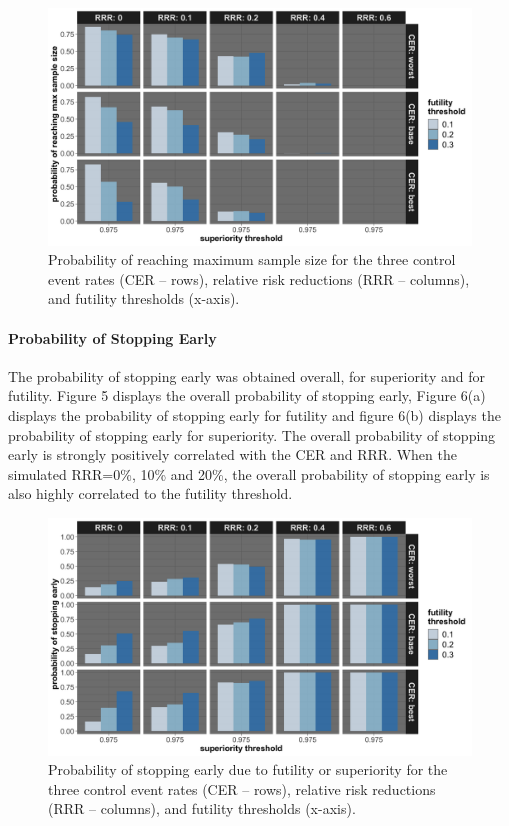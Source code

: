 \documentclass[]{article}
\let\oldparagraph\paragraph
\renewcommand{\paragraph}[1]{\oldparagraph{#1}\mbox{}}
\begin{document}
\begin{figure}
  \caption{Probability of reaching maximum sample size for the three control event rates (CER – rows), relative
  risk reductions (RRR – columns), and futility thresholds (x-axis).}
  \includegraphics{../p1_plots/batch_size_nb_1000/prob_reach_max_size_p1.png}
\end{figure}

\clearpage

\hypertarget{probability-of-stopping-early}{%
\paragraph{Probability of Stopping
Early}\label{probability-of-stopping-early}}

The probability of stopping early was obtained overall, for superiority
and for futility. Figure 5 displays the overall probability of stopping
early, Figure 6(a) displays the probability of stopping early for
futility and figure 6(b) displays the probability of stopping early for
superiority. The overall probability of stopping early is strongly
positively correlated with the CER and RRR. When the simulated RRR=0\%,
10\% and 20\%, the overall probability of stopping early is also highly
correlated to the futility threshold.

\begin{figure}
  \caption{Probability of stopping early due to futility or superiority for the three control event rates (CER – rows), relative risk reductions (RRR – columns), and futility thresholds (x-axis).}
  \includegraphics{../p1_plots/batch_size_nb_1000/prob_stop_early_p1.png}
\end{figure}
\end{document}
